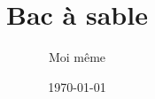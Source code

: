 \documentclass[11 pt]{report} %
\title{Bac à sable}
\author{Moi même}
\date{\today}
\begin{document}
\maketitle

\begin{abstract}
  \blindtext
\end{abstract}

\blinddocument

\end{document}
